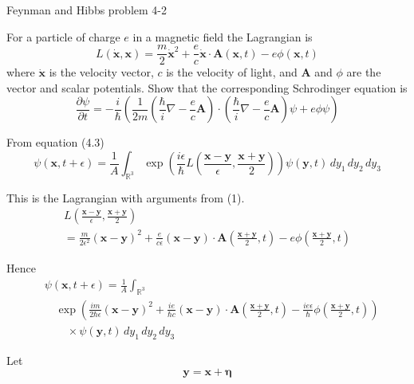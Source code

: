 \documentclass[12pt]{article}
\newcommand\INT{\int_{\mathbb R^3}}
\begin{document}
\begin{center}
Feynman and Hibbs problem 4-2
\end{center}

For a particle of charge $e$ in a magnetic field the Lagrangian is
\begin{equation*}
L(\dot{\mathbf x},\mathbf x)=\frac{m}{2}\dot{\mathbf x}^2
+\frac{e}{c}\dot{\mathbf x}\cdot\mathbf A(\mathbf x,t)-e\phi(\mathbf x,t)
\end{equation*}
where $\dot{\mathbf x}$ is the velocity vector,
$c$ is the velocity of light, and $\mathbf A$ and $\phi$
are the vector and scalar potentials.
Show that the corresponding Schrodinger equation is
\begin{equation*}
\frac{\partial\psi}{\partial t}
=-\frac{i}{\hbar}\left(
\frac{1}{2m}\left(\frac{\hbar}{i}\nabla-\frac{e}{c}\mathbf A\right)
\cdot
\left(\frac{\hbar}{i}\nabla-\frac{e}{c}\mathbf A\right)\psi
+e\phi\psi
\right)
\end{equation*}

From equation (4.3)
\begin{equation*}
\psi(\mathbf x,t+\epsilon)=\frac{1}{A}\INT\exp\left(
\frac{i\epsilon}{\hbar}L\left(\frac{\mathbf x-\mathbf y}{\epsilon},\frac{\mathbf x+\mathbf y}{2}\right)
\right)\psi(\mathbf y,t)
\,dy_1\,dy_2\,dy_3
\tag{1}
\end{equation*}

This is the Lagrangian with arguments from (1).
\begin{multline*}
L\left(\frac{\mathbf x-\mathbf y}{\epsilon},\frac{\mathbf x+\mathbf y}{2}\right)
\\
=\frac{m}{2\epsilon^2}(\mathbf x-\mathbf y)^2
+\frac{e}{c\epsilon}(\mathbf x-\mathbf y)\cdot\mathbf A\left(\frac{\mathbf x+\mathbf y}{2},t\right)
-e\phi\left(\frac{\mathbf x+\mathbf y}{2},t\right)
\end{multline*}

Hence
\begin{align*}
&\psi(\mathbf x,t+\epsilon)=\frac{1}{A}\INT
\\
&\quad\exp
\left(
\frac{im}{2\hbar\epsilon}(\mathbf x-\mathbf y)^2
+\frac{ie}{\hbar c}(\mathbf x-\mathbf y)\cdot\mathbf A\left(\frac{\mathbf x+\mathbf y}{2},t\right)
-\frac{ie\epsilon}{\hbar}\phi\left(\frac{\mathbf x+\mathbf y}{2},t\right)
\right)
\\
&\quad\quad{}\times\psi(\mathbf y,t)
\,dy_1\,dy_2\,dy_3
\end{align*}

Let
\begin{equation*}
\mathbf y=\mathbf x+\boldsymbol\eta
\end{equation*}
\end{document}
